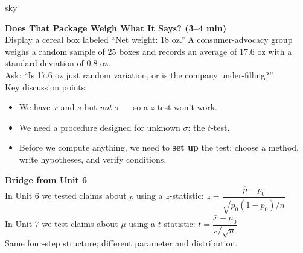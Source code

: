 \documentclass[10pt]{article}
\begin{document}
\begin{skillbox}[Hook]{sky}
\begin{minipage}[t]{0.55\linewidth}
    \textbf{Does That Package Weigh What It Says? (3--4 min)}\\
    Display a cereal box labeled ``Net weight: 18 oz.'' A consumer-advocacy group weighs
    a random sample of 25 boxes and records an average of 17.6 oz with a standard deviation
    of 0.8 oz.\\[4pt]
    Ask: ``Is 17.6 oz just random variation, or is the company under-filling?''\\[4pt]
    Key discussion points:
    \begin{itemize}
        \item We have $\bar x$ and $s$ but \emph{not} $\sigma$ --- so a $z$-test won't work.
        \item We need a procedure designed for unknown $\sigma$: the $t$-test.
        \item Before we compute anything, we need to \textbf{set up} the test: choose
              a method, write hypotheses, and verify conditions.
    \end{itemize}
\end{minipage}
\hfill
\begin{minipage}[t]{0.40\linewidth}
    \textbf{Bridge from Unit 6}\\
    In Unit 6 we tested claims about $p$ using a $z$-statistic:
    $z = \dfrac{\hat p - p_0}{\sqrt{p_0(1-p_0)/n}}$\\[6pt]
    In Unit 7 we test claims about $\mu$ using a $t$-statistic:
    $t = \dfrac{\bar x - \mu_0}{s/\sqrt{n}}$\\[6pt]
    Same four-step structure; different parameter and distribution.
\end{minipage}
\end{skillbox}
\end{document}
